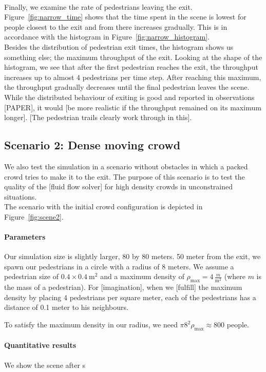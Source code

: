 \documentclass{article}
\begin{document}
\ \\
Finally, we examine the rate of pedestrians leaving the exit. Figure~\ref{fig:narrow_time} shows that the time spent in the scene is lowest for people closest to the exit and from there increases gradually. This is in accordance with the histogram in Figure~\ref{fig:narrow_histogram}. \\
Besides the distribution of pedestrian exit times, the histogram shows us something else; the maximum throughput of the exit. Looking at the shape of the histogram, we see that after the first pedestrian reaches the exit, the throughput increases up to almost 4 pedestrians per time step.
After reaching this maximum, the throughput gradually decreases until the final pedestrian leaves the scene. 
While the distributed behaviour of exiting is good and reported in observations [PAPER], it would [be more realistic if the throughput remained on its maximum longer]. [The pedestrian trails clearly work through in this].

\subsection{Scenario 2: Dense moving crowd}
We also test the simulation in a scenario without obstacles in which a packed crowd tries to make it to the exit. The purpose of this scenario is to test the quality of the [fluid flow solver] for high density crowds in unconstrained situations.\\
The scenario with the initial crowd configuration is depicted in Figure~\ref{fig:scene2}.
\paragraph{Parameters}
Our simulation size is slightly larger, 80 by 80 meters. 50 meter from the exit, we spawn our pedestrians in a circle with a radius of 8 meters. We assume a pedestrian size of $0.4\times 0.4\ \textrm{m}^2$ and a maximum density of $\rho_{\max} = 4\,\frac{m}{\textrm{m}^2}$ (where $m$ is the mass of a pedestrian). For [imagination], when we [fulfill] the maximum density by placing 4 pedestrians per square meter, each of the pedestrians has a distance of 0.1 meter to his neighbours.

To satisfy the maximum density in our radius, we need $\pi 8^2 \rho_{\max}\approx 800$ people.
\paragraph{Quantitative results}
We show the scene after s
\end{document}
